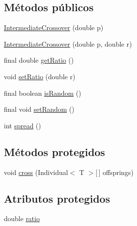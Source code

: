 \subsection*{Métodos públicos}
\begin{DoxyCompactItemize}
\item 
\hyperlink{classjenes_1_1stage_1_1operator_1_1common_1_1_intermediate_crossover_3_01_t_01extends_01_double_chromosome_01_4_a79954756cd6cd0ffc58cd4dfbee77ca3}{Intermediate\-Crossover} (double p)
\item 
\hyperlink{classjenes_1_1stage_1_1operator_1_1common_1_1_intermediate_crossover_3_01_t_01extends_01_double_chromosome_01_4_a1e108f61a2e8e654e65162ef8833441f}{Intermediate\-Crossover} (double p, double r)
\item 
final double \hyperlink{classjenes_1_1stage_1_1operator_1_1common_1_1_intermediate_crossover_3_01_t_01extends_01_double_chromosome_01_4_a5b3f99723d401833db13476b27072985}{get\-Ratio} ()
\item 
void \hyperlink{classjenes_1_1stage_1_1operator_1_1common_1_1_intermediate_crossover_3_01_t_01extends_01_double_chromosome_01_4_a1ed8c3472bcf1d00bebcb5f5e4f4988a}{set\-Ratio} (double r)
\item 
final boolean \hyperlink{classjenes_1_1stage_1_1operator_1_1common_1_1_intermediate_crossover_3_01_t_01extends_01_double_chromosome_01_4_aaed91a2488a595ef3033be9b87f7a6d1}{is\-Random} ()
\item 
final void \hyperlink{classjenes_1_1stage_1_1operator_1_1common_1_1_intermediate_crossover_3_01_t_01extends_01_double_chromosome_01_4_a7e3eb40cb2a7db9c3a80c98547cce253}{set\-Random} ()
\item 
int \hyperlink{classjenes_1_1stage_1_1operator_1_1common_1_1_intermediate_crossover_3_01_t_01extends_01_double_chromosome_01_4_a4007c5dca65a48c2ea6dfbcc2372a0b2}{spread} ()
\end{DoxyCompactItemize}
\subsection*{Métodos protegidos}
\begin{DoxyCompactItemize}
\item 
void \hyperlink{classjenes_1_1stage_1_1operator_1_1common_1_1_intermediate_crossover_3_01_t_01extends_01_double_chromosome_01_4_a712aa913c166a008a0833358270cd483}{cross} (Individual$<$ T $>$\mbox{[}$\,$\mbox{]} offsprings)
\end{DoxyCompactItemize}
\subsection*{Atributos protegidos}
\begin{DoxyCompactItemize}
\item 
double \hyperlink{classjenes_1_1stage_1_1operator_1_1common_1_1_intermediate_crossover_3_01_t_01extends_01_double_chromosome_01_4_a00aeef350858cb4ee81f06f7cf7a4c06}{ratio}
\end{DoxyCompactItemize}


